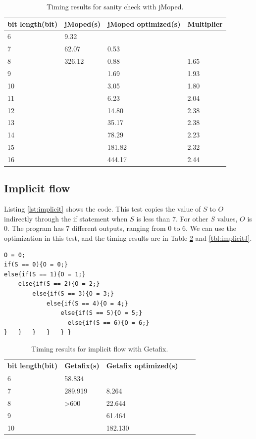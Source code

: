 \begin{table}[!h]
\centering
\begin{tabular}{|l|l|l|l|}
\hline
bit length(bit) & jMoped(s) & jMoped optimized(s) & Multiplier \\ \hline
6 & 9.32 &  &  \\ \hline
7 & 62.07 & 0.53 &  \\ \hline
8 & 326.12 & 0.88 & 1.65 \\ \hline
9 &  & 1.69 & 1.93 \\ \hline
10 &  & 3.05 & 1.80 \\ \hline
11 &  & 6.23 & 2.04 \\ \hline
12 &  & 14.80 & 2.38 \\ \hline
13 &  & 35.17 & 2.38 \\ \hline
14 &  & 78.29 & 2.23 \\ \hline
15 &  & 181.82 & 2.32 \\ \hline
16 &  & 444.17 & 2.44 \\ \hline
\end{tabular}
\caption{Timing results for sanity check with jMoped.}
\label{tbl:sanityJ}
\end{table}

\subsection{Implicit flow}
Listing \ref{lst:implicit} shows the code. This test copies the value of $S$ to $O$ indirectly through the if statement when $S$ is less than $7$. For other $S$ values, $O$ is $0$. The program has 7 different outputs, ranging from $0$ to $6$. We can use the optimization in this test, and the timing results are in Table \ref{tbl:implicitG} and \ref{tbl:implicitJ}.

\lstset{language=C}  
\begin{lstlisting}[float=!h, caption={Implict flow test program.},label=lst:implicit]
O = 0;
if(S == 0){O = 0;}
else{if(S == 1){O = 1;}
	else{if(S == 2){O = 2;}
		else{if(S == 3){O = 3;}
			else{if(S == 4){O = 4;}
				else{if(S == 5){O = 5;}
				  else{if(S == 6){O = 6;}
}	}	}	} 	} }
\end{lstlisting}

\begin{table}[!h]
\centering
\begin{tabular}{|l|l|l|l|l|}
\hline
{bit length(bit)} & Getafix(s) & {Getafix optimized(s)}  \\ \hline
6 & {58.834} & {}  \\ \hline
7 & {289.919} & 8.264  \\ \hline
8 & \textgreater 600 & 22.644  \\ \hline
9 &  & 61.464  \\ \hline
10 &  & 182.130 \\ \hline
\end{tabular}
\caption{Timing results for implicit flow with Getafix.}
\label{tbl:implicitG}
\end{table}

